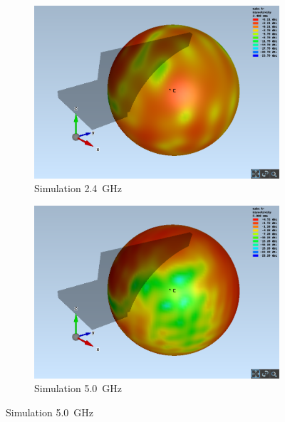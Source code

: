 \begin{figure}[h!]
	\centering
	\begin{subfigure}[b]{0.48\textwidth}
		\includegraphics[width=1\textwidth]{../fig/plt/crazy_stuff_l4_pcb_v2c_laptop_1a_105_2ghz4_3d_eabs_sphere.png}
		\caption{Simulation \SI{2.4}{\giga\hertz}}
	\end{subfigure}
	\begin{subfigure}[b]{0.48\textwidth}
		\includegraphics[width=1\textwidth]{../fig/plt/crazy_stuff_l4_pcb_v2c_laptop_1a_105_5ghz_3d_eabs_sphere.png}
		\caption{Simulation \SI{5.0}{\giga\hertz}}
	\end{subfigure}


\end{figure}
